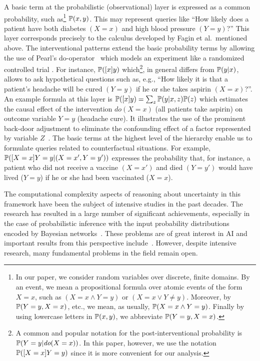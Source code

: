 \documentclass[a4paper,UKenglish,cleveref, autoref, thm-restate]{lipics-v2021}
\newcommand{\compactEquals}[1]{\let\IsInPP=1#1\let\IsInPP=\relax}
\newcommand{\PP}[1]{\mathbb{P}(\compactEquals{#1})}
\def\mmid{ | }
\def\dop{\textit{do}}
\begin{document}
A basic term at the probabilistic (observational) layer is expressed as a common probability, 
such as\footnote{In our paper, we consider random variables over discrete, finite domains. By an event,
we mean a propositional formula over atomic events of the form $X=x$, such 
as $(X=x\wedge Y=y)$ or $(X=x \vee Y\neq y)$. Moreover, by $\PP{Y=y, X=x}$, etc., we mean, 
as usually, $\PP{X=x \wedge Y=y}$. Finally by using lowercase letters in $\PP{x, y}$, we abbreviate  $\PP{Y=y, X=x}$. }
$\PP{x, y}$. This may represent queries like ``How likely does a patient 
have both diabetes $(X=x)$ and high blood pressure $(Y=y)$?'' This layer corresponds precisely to the calculus developed by Fagin et al.\ mentioned above.
The interventional patterns extend the basic probability terms by allowing the use of Pearl's 
do-operator~\cite{Pearl2009} which models an experiment like a randomized controlled trial \cite{fisher1936design}. 
For instance, $\PP{[x]y}$ which\footnote{A common and popular 
notation for the post-interventional probability is $\PP{Y=y\mmid \compactEquals{\dop(X=x)}}$. 
In this paper, however,  we use the notation $\PP{[X=x]Y=y}$ since it is more convenient for our analysis.}, 
in general differs from $\PP{y\mmid x}$, allows to ask hypothetical questions such as, e.g., 
``How likely it is that a patient's headache will be cured $(Y=y)$ if he or she takes aspirin $(X=x)$?''. 
An example formula at this layer is $\PP{[x]y}=\sum_z \PP{y\mmid x,z}\PP{z}$
which estimates the causal effect of the intervention  $\dop(X = x)$ (all patients take aspirin) 
on outcome variable $Y = y$ (headache cure). It illustrates the use of the prominent back-door 
adjustment to eliminate the confounding effect of a factor represented by variable $Z$~\cite{Pearl2009}.
The basic terms at the highest level of the hierarchy enable us to formulate queries related to counterfactual 
situations. For example, $\PP{[X=x]Y=y \mmid (X=x',Y=y')}$  expresses the probability that, for instance, 
a patient who did not receive a vaccine $(X=x')$ and died $(Y=y')$ would have lived ($Y=y$) if he or she had been vaccinated ($X=x$).

The computational complexity aspects of reasoning about uncertainty in this framework 
have been the subject of intensive studies in the past decades. The research has resulted 
in a large number of significant achievements, especially in the case of probabilistic 
inference with the input probability distributions encoded by Bayesian 
networks~\cite{pearl1988probabilistic}. These problems are of great interest in AI and 
important results from this perspective 
include~\cite{cooper1990computational,dagum1993approximating,roth1996hardness,park2004complexity,koller2009probabilistic}.
However, despite intensive research, many fundamental problems in the field remain open.
\end{document}
